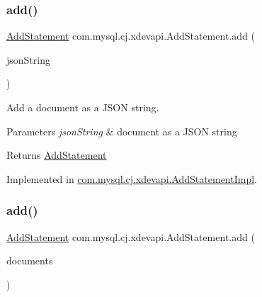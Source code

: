 \subsubsection{\texorpdfstring{add()}{add()}\hspace{0.1cm}{\footnotesize\ttfamily [1/2]}}
{\footnotesize\ttfamily \mbox{\hyperlink{interfacecom_1_1mysql_1_1cj_1_1xdevapi_1_1_add_statement}{Add\+Statement}} com.\+mysql.\+cj.\+xdevapi.\+Add\+Statement.\+add (\begin{DoxyParamCaption}\item[{String}]{json\+String }\end{DoxyParamCaption})}

Add a document as a J\+S\+ON string.


\begin{DoxyParams}{Parameters}
{\em json\+String} & document as a J\+S\+ON string \\
\hline
\end{DoxyParams}
\begin{DoxyReturn}{Returns}
\mbox{\hyperlink{interfacecom_1_1mysql_1_1cj_1_1xdevapi_1_1_add_statement}{Add\+Statement}} 
\end{DoxyReturn}


Implemented in \mbox{\hyperlink{classcom_1_1mysql_1_1cj_1_1xdevapi_1_1_add_statement_impl_abba297ed8c7bfb2afad21bebcb3ca13a}{com.\+mysql.\+cj.\+xdevapi.\+Add\+Statement\+Impl}}.

\mbox{\label{interfacecom_1_1mysql_1_1cj_1_1xdevapi_1_1_add_statement_a886e1294099cf00085c882aba48bf06e}} 
\subsubsection{\texorpdfstring{add()}{add()}\hspace{0.1cm}{\footnotesize\ttfamily [2/2]}}
{\footnotesize\ttfamily \mbox{\hyperlink{interfacecom_1_1mysql_1_1cj_1_1xdevapi_1_1_add_statement}{Add\+Statement}} com.\+mysql.\+cj.\+xdevapi.\+Add\+Statement.\+add (\begin{DoxyParamCaption}\item[{Db\+Doc...}]{documents }\end{DoxyParamCaption})}

